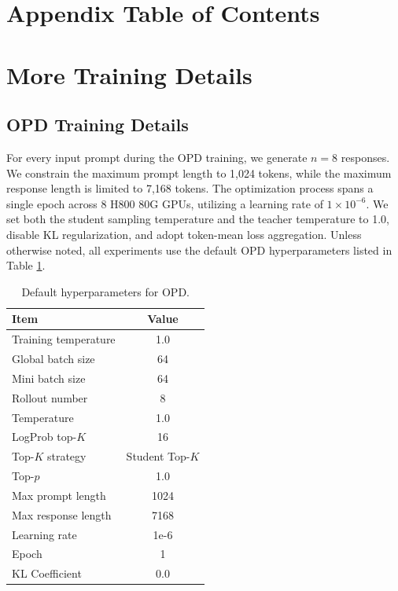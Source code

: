\newpage
\section*{Appendix Table of Contents}
\startcontents[appendix]
\newpage

\section{More Training Details} \label{app:training_details}

\subsection{OPD Training Details} \label{app:opd_training_details}
For every input prompt during the OPD training, we generate $n=8$ responses. We constrain the maximum prompt length to 1,024 tokens, while the maximum response length is limited to 7,168 tokens. The optimization process spans a single epoch across 8 H800 80G GPUs, utilizing a learning rate of $1 \times 10^{-6}$. We set both the student sampling temperature and the teacher temperature to 1.0, disable KL regularization, and adopt token-mean loss aggregation. Unless otherwise noted, all experiments use the default OPD hyperparameters listed in Table \ref{tab:opd_hyperparameters}.

\begin{table}[htbp]
\centering
\caption{Default hyperparameters for OPD.}
\label{tab:opd_hyperparameters}
\begin{tabular}{lc}
\toprule
\textbf{Item} & \textbf{Value} \\
\midrule
Training temperature & 1.0 \\
Global batch size & 64 \\
Mini batch size & 64 \\
Rollout number & 8 \\
Temperature & 1.0 \\
LogProb top-$K$ & 16 \\
Top-$K$ strategy & Student Top-$K$ \\
Top-$p$ & 1.0 \\
Max prompt length & 1024 \\
Max response length & 7168 \\
Learning rate & 1e-6 \\
Epoch & 1 \\
KL Coefficient & 0.0 \\
\bottomrule
\end{tabular}
\end{table}


